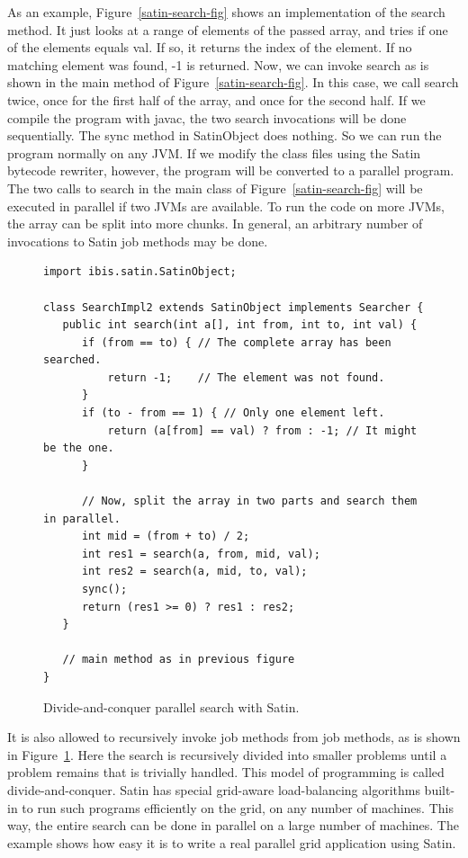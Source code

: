 \documentclass[10pt]{article}
\begin{document}
As an example, Figure~\ref{satin-search-fig} shows an implementation of the search
method. It just looks at a range of elements of the passed array, and
tries if one of the elements equals val. If so, it returns the index
of the element. If no matching element was found, -1 is returned.
Now, we can invoke search as is shown in the main method of Figure~\ref{satin-search-fig}.
In this case, we call search twice, once for the first half of the
array, and once for the second half. If we compile the program with
javac, the two search invocations will be done sequentially. The sync
method in SatinObject does nothing. So we can run the program normally
on any JVM.  If we modify the class files using the Satin bytecode
rewriter, however, the program will be converted to a parallel
program.  The two calls to search in the main class of Figure~\ref{satin-search-fig} will
be executed in parallel if two JVMs are available. To run the code on
more JVMs, the array can be split into more chunks. In general, an
arbitrary number of invocations to Satin job methods may be done.

\begin{figure}[t!]
{\small
\begin{verbatim}
import ibis.satin.SatinObject;

class SearchImpl2 extends SatinObject implements Searcher {
   public int search(int a[], int from, int to, int val) {
      if (from == to) { // The complete array has been searched.
          return -1;    // The element was not found.
      }
      if (to - from == 1) { // Only one element left.
          return (a[from] == val) ? from : -1; // It might be the one.
      }

      // Now, split the array in two parts and search them in parallel.
      int mid = (from + to) / 2;
      int res1 = search(a, from, mid, val);
      int res2 = search(a, mid, to, val);
      sync();
      return (res1 >= 0) ? res1 : res2;
   }

   // main method as in previous figure
}
\end{verbatim}
}
\caption{Divide-and-conquer parallel search with Satin.}
\label{satin-par-search-fig}
\end{figure}

It is also allowed to recursively invoke job methods from job methods,
as is shown in Figure~\ref{satin-par-search-fig}. Here the search is recursively divided into
smaller problems until a problem remains that is trivially
handled. This model of programming is called divide-and-conquer. Satin
has special grid-aware load-balancing algorithms built-in to run such
programs efficiently on the grid, on any number of machines. This way,
the entire search can be done in parallel on a large number of
machines. The example shows how easy it is to write a real parallel
grid application using Satin.  
\end{document}
